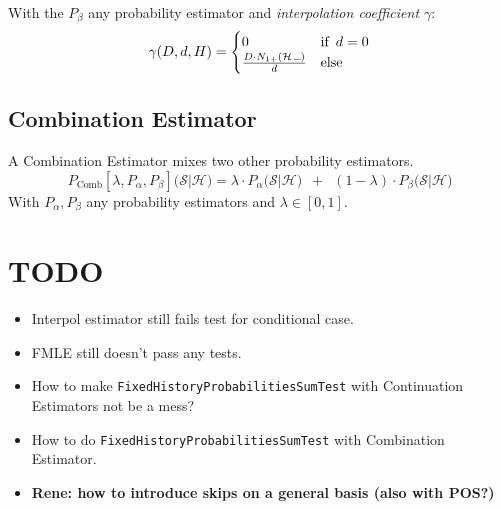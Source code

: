 \documentclass[11pt,a4paper]{article}
\newcommand{\Seq}{\mathcal{S}}
\newcommand{\Hist}{\mathcal{H}}
\newcommand{\SmallSkp}{\rule{5pt}{.3pt}}
\newcommand{\rp}[1]{\textbf{Rene: #1}}
\begin{document}
  With the $P_\beta$ any probability estimator and
  \emph{interpolation coefficient $\gamma$}:
  \begin{equation}
    \gamma(D,d,H) = \begin{cases}
      0 & \text{if} \enspace d = 0 \\
      \frac{D \cdot N_{1+}(\Hist \, \SmallSkp)}{d} & \text{else}
    \end{cases}
  \end{equation}

  \subsection{Combination Estimator}

  A Combination Estimator mixes two other probability estimators.
  \begin{equation}
    P_\mathrm{Comb}{\scriptstyle[\lambda,P_\alpha,P_\beta]}\big(\Seq | \Hist\big) = \lambda \cdot P_\alpha\big(\Seq | \Hist\big) \enspace + \enspace (1 - \lambda) \cdot P_\beta\big(\Seq | \Hist\big)
  \end{equation}
  With $P_\alpha,P_\beta$ any probability estimators and $\lambda \in [0,1]$.

  \section{TODO}

  \begin{itemize}
    \item Interpol estimator still fails test for conditional case.
    \item FMLE still doesn't pass any tests.
    \item How to make \texttt{FixedHistoryProbabilitiesSumTest} with Continuation Estimators not be a mess?
    \item How to do \texttt{FixedHistoryProbabilitiesSumTest} with Combination Estimator.
    \item \rp{how to introduce skips on a general basis (also with POS?)}
  \end{itemize}
\end{document}
